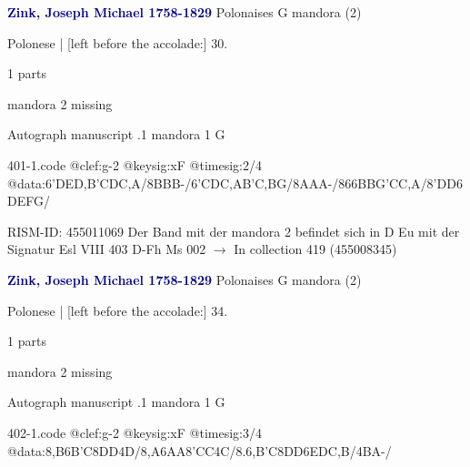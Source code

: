 \documentclass[twocolumn]{book}
\begin{document}
\newline \par \vspace{7pt} \textcolor{darkblue}{\textbf{Zink, Joseph Michael  1758-1829}}
\newline Polonaises  G  
\newline mandora (2)
\newline \begin{itshape}[f.18r, at left:] Polonese | [left before the accolade:] 30.\end{itshape} 
\newline \textcolor{darkblue}{}  1 parts  
\newline \begin{small} mandora 2 missing\end{small} 
\newline Autograph manuscript
.1  mandora 1  G  
\begin{filecontents*}{401-1.code}
@clef:g-2
@keysig:xF
@timesig:2/4
@data:6'DED,B'CDC,A/8BBB-/6'CDC,AB'C,BG/8AAA-/866{BBG}{'CC,A}/8'DD{6DE}{FG}/
\end{filecontents*}
\newline
%

\newline RISM-ID: 455011069
\newline Der Band mit der mandora 2 befindet sich in D Eu mit der Signatur Esl VIII 403
\newline D-Fh  Ms 002
\newline $\rightarrow$ In collection 419 (455008345)

\newline \par \vspace{7pt} \textcolor{darkblue}{\textbf{Zink, Joseph Michael  1758-1829}}
\newline Polonaises  G  
\newline mandora (2)
\newline \begin{itshape}[f.20r, at left:] Polonese | [left before the accolade:] 34.\end{itshape} 
\newline \textcolor{darkblue}{}  1 parts  
\newline \begin{small} mandora 2 missing\end{small} 
\newline Autograph manuscript
.1  mandora 1  G  
\begin{filecontents*}{402-1.code}
@clef:g-2
@keysig:xF
@timesig:3/4
@data:{8,B6B'C}8DD4D/{8,A6AA}{8'CC}4C/{8.6,B'C}8DD6EDC,B/4BA-/
\end{filecontents*}
\newline
%
\end{document}
